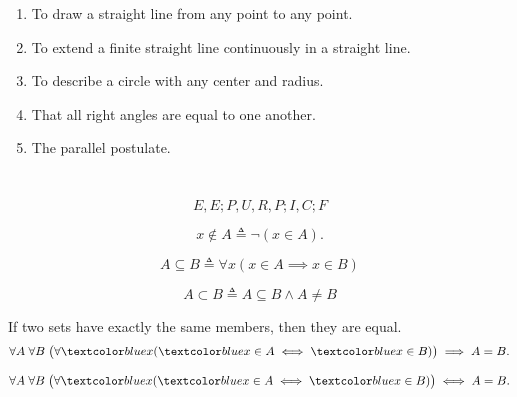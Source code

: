 \begin{frame}{}

  \begin{columns}
      \begin{enumerate}[(1)]
	\item To draw a straight line from any point to any point.
	\item To extend a finite straight line continuously in a straight line.
	\item To describe a circle with any center and radius.
	\item That all right angles are equal to one another.
	\item The parallel postulate.
      \end{enumerate}
  \end{columns}
\end{frame}

\begin{frame}{}
  \[
    E, E; P, U, R, P; I, C; F
  \]
\end{frame}

\begin{frame}{}
  \begin{definition}[$\notin$]
    \[
      x \notin A \triangleq \lnot (x \in A).
    \]
  \end{definition}

  \pause
  \begin{definition}[$\subseteq, \subset$]
    \[
      A \subseteq B \triangleq \forall x (x \in A \implies x \in B)
    \]

    \[
      A \subset B \triangleq A \subseteq B \land A \neq B
    \]
  \end{definition}
\end{frame}

\begin{frame}{}
  \begin{axiom}
    If two sets have exactly the same members, then they are equal.
    \[
      \forall A\; \forall B\; \big(\forall  \blue{x} (\blue{x} \in A \iff \blue{x} \in B) \big) \implies A = B.
    \]
  \end{axiom}

  \pause
  \[
    \forall A\; \forall B\; \big(\forall  \blue{x} (\blue{x} \in A \iff \blue{x} \in B) \big) \iff A = B.
  \]
\end{frame}

